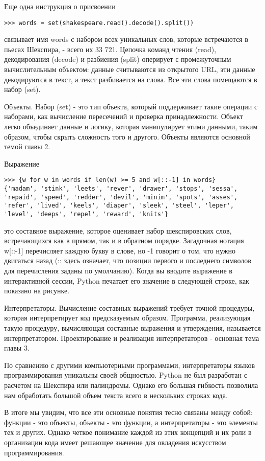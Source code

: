 Еще одна инструкция о присвоении

\begin{lstlisting}
>>> words = set(shakespeare.read().decode().split())
\end{lstlisting}

связывает имя words с набором всех уникальных слов, которые встречаются в пьесах Шекспира, - всего их 33 721. Цепочка команд чтения (read), декодирования (decode) и разбиения (split) оперирует с промежуточным вычислительным объектом: данные считываются из открытого URL, эти данные декодируются в текст, а текст разбивается на слова. Все эти слова помещаются в набор (set).

Объекты. Набор (set) - это тип объекта, который поддерживает такие операции с наборами, как вычисление пересечений и проверка принадлежности. Объект легко объединяет данные и логику, которая манипулирует этими данными, таким образом, чтобы скрыть сложность того и другого. Объекты являются основной темой главы 2.

Выражение

\begin{lstlisting}
>>> {w for w in words if len(w) >= 5 and w[::-1] in words}
{'madam', 'stink', 'leets', 'rever', 'drawer', 'stops', 'sessa',
'repaid', 'speed', 'redder', 'devil', 'minim', 'spots', 'asses',
'refer', 'lived', 'keels', 'diaper', 'sleek', 'steel', 'leper',
'level', 'deeps', 'repel', 'reward', 'knits'}
\end{lstlisting}

это составное выражение, которое оценивает набор шекспировских слов, встречающихся как в прямом, так и в обратном порядке. Загадочная нотация w[::-1] перечисляет каждую букву в слове, но -1 говорит о том, что нужно двигаться назад (:: здесь означает, что позиции первого и последнего символов для перечисления заданы по умолчанию). Когда вы вводите выражение в интерактивной сессии, Python печатает его значение в следующей строке, как показано на рисунке.

Интерпретаторы. Вычисление составных выражений требует точной процедуры, которая интерпретирует код предсказуемым образом. Программа, реализующая такую процедуру, вычисляющая составные выражения и утверждения, называется интерпретатором. Проектирование и реализация интерпретаторов - основная тема главы 3.

По сравнению с другими компьютерными программами, интерпретаторы языков программирования уникальны своей общностью. Python не был разработан с расчетом на Шекспира или палиндромы. Однако его большая гибкость позволила нам обработать большой объем текста всего в нескольких строках кода.

В итоге мы увидим, что все эти основные понятия тесно связаны между собой: функции - это объекты, объекты - это функции, а интерпретаторы - это элементы тех и других. Однако четкое понимание каждой из этих концепций и их роли в организации кода имеет решающее значение для овладения искусством программирования.

